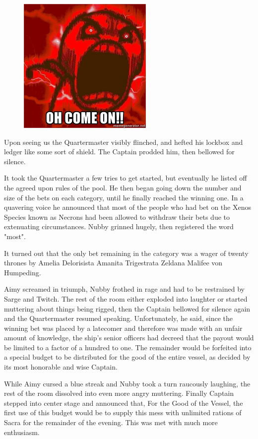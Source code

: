 \begin{figure}
	\begin{center}
		\includegraphics[width=\figwidth]{pics/11/104.png}
	\end{center}
\end{figure}
Upon seeing us the Quartermaster visibly flinched, and hefted his lockbox and ledger like some sort of shield. 
The Captain prodded him, then bellowed for silence.

It took the Quartermaster a few tries to get started, but eventually he listed off the agreed upon rules of the pool. 
He then began going down the number and size of the bets on each category, until he finally reached the winning one. 
In a quavering voice he announced that most of the people who had bet on the Xenos Species known as Necrons had been allowed to withdraw their bets due to extenuating circumstances. 
Nubby grinned hugely, then registered the word "most".

It turned out that the only bet remaining in the category was a wager of twenty thrones by Amelia Delorisista Amanita Trigestrata Zeldana Malifee von Humpeding.

Aimy screamed in triumph, Nubby frothed in rage and had to be restrained by Sarge and Twitch. 
The rest of the room either exploded into laughter or started muttering about things being rigged, then the Captain bellowed for silence again and the Quartermaster resumed speaking. 
Unfortunately, he said, since the winning bet was placed by a latecomer and therefore was made with an unfair amount of knowledge, the ship's senior officers had decreed that the payout would be limited to a factor of a hundred to one. 
The remainder would be forfeited into a special budget to be distributed for the good of the entire vessel, as decided by its most honorable and wise Captain.

While Aimy cursed a blue streak and Nubby took a turn raucously laughing, the rest of the room dissolved into even more angry muttering. 
Finally Captain stepped into center stage and announced that, For the Good of the Vessel, the first use of this budget would be to supply this mess with unlimited rations of Sacra for the remainder of the evening. 
This was met with much more enthusiasm.

